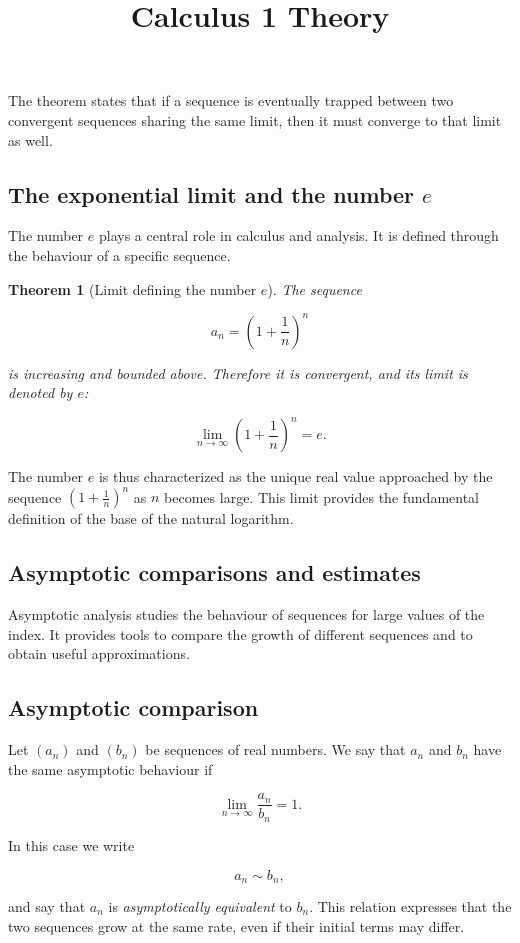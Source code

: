 \documentclass[11pt,a4paper]{article} \usepackage[T1]{fontenc}
\theoremstyle{plain} \newtheorem{theorem}{Theorem} \title{Calculus 1 Theory}
\begin{document}
The theorem states that if a sequence is eventually trapped between two
convergent sequences sharing the same limit, then it must converge to that
limit as well.

\subsection{The exponential limit and the number $e$}

The number $e$ plays a central role in calculus and analysis. It is defined
through the behaviour of a specific sequence.

\begin{theorem}
[Limit defining the number $e$] The sequence

\[
a_n = \left(1+\frac{1}{n}\right)^n
\]

is increasing and bounded above. Therefore it is convergent, and its limit is
denoted by $e$:

\[
\lim_{n\to\infty} \left(1+\frac{1}{n}\right)^n = e.
\]

\end{theorem}

The number $e$ is thus characterized as the unique real value approached by the
sequence $\left(1+\frac{1}{n}\right)^n$ as $n$ becomes large. This limit
provides the fundamental definition of the base of the natural logarithm.

\subsection{Asymptotic comparisons and estimates}

Asymptotic analysis studies the behaviour of sequences for large values of the
index. It provides tools to compare the growth of different sequences and to
obtain useful approximations.

\subsection*{Asymptotic comparison}

Let $(a_n)$ and $(b_n)$ be sequences of real numbers. We say that $a_n$ and
$b_n$ have the same asymptotic behaviour if

\[
\lim_{n\to\infty} \frac{a_n}{b_n} = 1.
\]

In this case we write

\[
a_n \sim b_n,
\]

and say that $a_n$ is \emph{asymptotically equivalent} to $b_n$. This relation
expresses that the two sequences grow at the same rate, even if their initial
terms may differ.
\end{document}
